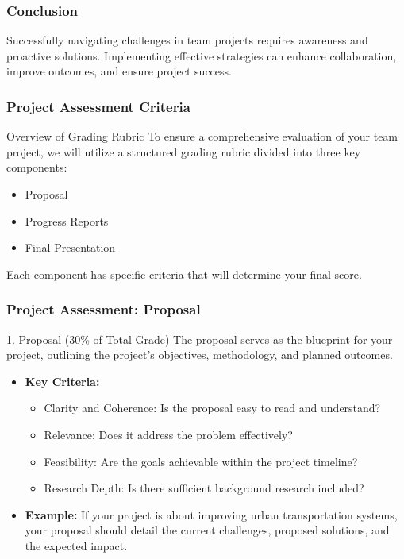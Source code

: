\documentclass[aspectratio=169]{beamer}
\begin{document}
\begin{frame}[fragile]
    \frametitle{Conclusion}
    Successfully navigating challenges in team projects requires awareness and proactive solutions. Implementing effective strategies can enhance collaboration, improve outcomes, and ensure project success.
\end{frame}

\begin{frame}[fragile]
    \frametitle{Project Assessment Criteria}
    \begin{block}{Overview of Grading Rubric}
        To ensure a comprehensive evaluation of your team project, we will utilize a structured grading rubric divided into three key components: 
        \begin{itemize}
            \item Proposal
            \item Progress Reports
            \item Final Presentation
        \end{itemize}
        Each component has specific criteria that will determine your final score.
    \end{block}
\end{frame}

\begin{frame}[fragile]
    \frametitle{Project Assessment: Proposal}
    \begin{block}{1. Proposal (30\% of Total Grade)}
        The proposal serves as the blueprint for your project, outlining the project's objectives, methodology, and planned outcomes.
    \end{block}
    \begin{itemize}
        \item \textbf{Key Criteria:}
            \begin{itemize}
                \item Clarity and Coherence: Is the proposal easy to read and understand?
                \item Relevance: Does it address the problem effectively?
                \item Feasibility: Are the goals achievable within the project timeline?
                \item Research Depth: Is there sufficient background research included?
            \end{itemize}
        \item \textbf{Example:} If your project is about improving urban transportation systems, your proposal should detail the current challenges, proposed solutions, and the expected impact.
    \end{itemize}
\end{frame}
\end{document}
